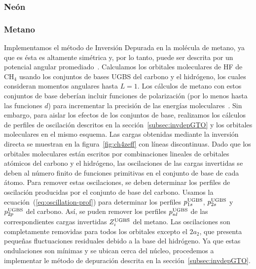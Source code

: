 \subsubsection{Neón}

\newpage
\subsubsection{Metano}

Implementamos el método de Inversión Depurada en la molécula de metano,
ya que es ésta es altamente simétrica y, por lo tanto, puede ser descrita
por un potencial angular promediado~\cite{Granados2016}. Calculamos los 
orbitales moleculares de HF de CH$_4$ usando los conjuntos de bases 
UGBS del carbono y el hidrógeno, los cuales consideran momentos angulares
hasta $L=1$. Los cálculos de metano con estos conjuntos de base deberían
incluir funciones de polarización (por lo menos hasta las funciones $d$)
para incrementar la precisión de las energías
 moleculares~\cite{Rothenberg1971,Hariharan1972}. Sin embargo, para
aislar los efectos de los conjuntos de base, realizamos los cálculos de 
perfiles de oscilación descritos en la sección~\ref{subsec:invdepGTO} y 
los orbitales moleculares en el mismo esquema. Las cargas obtenidas 
mediante la inversión directa se muestran en la figura~\ref{fig:ch4zeff} 
con líneas discontinuas. Dado que los orbitales moleculares están 
escritos por combinaciones lineales de orbitales atómicos del carbono
y el hidrógeno, las oscilaciones de las cargas invertidas se deben al 
número finito de funciones primitivas en el conjunto de base de cada átomo.
Para remover estas oscilaciones, se deben determinar los perfiles de 
oscilación producidas por el conjunto de base del carbono. Usamos la 
ecuación~(\ref{eq:oscillation-prof}) para determinar los perfiles
$p_{1s}^{\mbox{\scriptsize UGBS}}$, $p_{2s}^{\mbox{\scriptsize UGBS}}$ 
y $p_{2p}^{\mbox{\scriptsize UGBS}}$ del carbono. Así, se puden remover
los perfiles $p_{nl}^{\mbox{\scriptsize UGBS}}$ de las correspondientes
cargas invertidas $Z_{i}^{\mbox{\scriptsize UGBS}}$ del metano. Las
oscilaciones son completamente removidas para todos los orbitales 
excepto el $2a_2$, que presenta pequeñas fluctuaciones residuales debido
a la base del hidrógeno. Ya que estas ondulaciones son mínimas y se 
ubican cerca del núcleo, procedemos a implementar le método de 
depuración descrita en la sección~\ref{subsec:invdepGTO}. 

